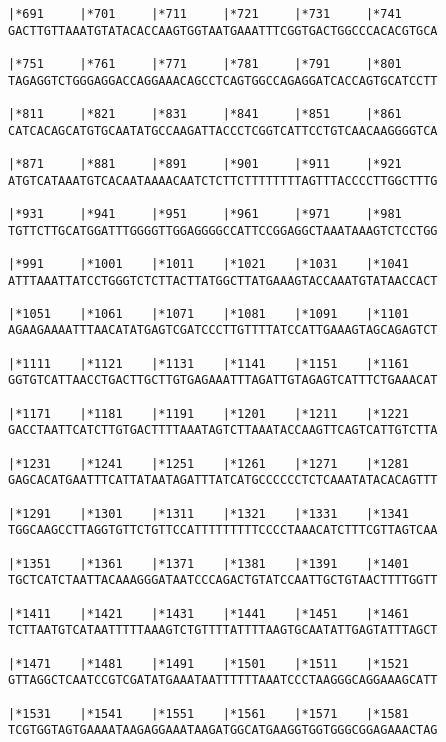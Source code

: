 \documentclass{article}
\begin{document}
\begin{Verbatim}[fontfamily=courier]
|*691     |*701     |*711     |*721     |*731     |*741     
GACTTGTTAAATGTATACACCAAGTGGTAATGAAATTTCGGTGACTGGCCCACACGTGCA

|*751     |*761     |*771     |*781     |*791     |*801     
TAGAGGTCTGGGAGGACCAGGAAACAGCCTCAGTGGCCAGAGGATCACCAGTGCATCCTT

|*811     |*821     |*831     |*841     |*851     |*861     
CATCACAGCATGTGCAATATGCCAAGATTACCCTCGGTCATTCCTGTCAACAAGGGGTCA

|*871     |*881     |*891     |*901     |*911     |*921     
ATGTCATAAATGTCACAATAAAACAATCTCTTCTTTTTTTTAGTTTACCCCTTGGCTTTG

|*931     |*941     |*951     |*961     |*971     |*981     
TGTTCTTGCATGGATTTGGGGTTGGAGGGGCCATTCCGGAGGCTAAATAAAGTCTCCTGG

|*991     |*1001    |*1011    |*1021    |*1031    |*1041    
ATTTAAATTATCCTGGGTCTCTTACTTATGGCTTATGAAAGTACCAAATGTATAACCACT

|*1051    |*1061    |*1071    |*1081    |*1091    |*1101    
AGAAGAAAATTTAACATATGAGTCGATCCCTTGTTTTATCCATTGAAAGTAGCAGAGTCT

|*1111    |*1121    |*1131    |*1141    |*1151    |*1161    
GGTGTCATTAACCTGACTTGCTTGTGAGAAATTTAGATTGTAGAGTCATTTCTGAAACAT

|*1171    |*1181    |*1191    |*1201    |*1211    |*1221    
GACCTAATTCATCTTGTGACTTTTAAATAGTCTTAAATACCAAGTTCAGTCATTGTCTTA

|*1231    |*1241    |*1251    |*1261    |*1271    |*1281    
GAGCACATGAATTTCATTATAATAGATTTATCATGCCCCCCTCTCAAATATACACAGTTT

|*1291    |*1301    |*1311    |*1321    |*1331    |*1341    
TGGCAAGCCTTAGGTGTTCTGTTCCATTTTTTTTTCCCCTAAACATCTTTCGTTAGTCAA

|*1351    |*1361    |*1371    |*1381    |*1391    |*1401    
TGCTCATCTAATTACAAAGGGATAATCCCAGACTGTATCCAATTGCTGTAACTTTTGGTT

|*1411    |*1421    |*1431    |*1441    |*1451    |*1461    
TCTTAATGTCATAATTTTTAAAGTCTGTTTTATTTTAAGTGCAATATTGAGTATTTAGCT

|*1471    |*1481    |*1491    |*1501    |*1511    |*1521    
GTTAGGCTCAATCCGTCGATATGAAATAATTTTTTAAATCCCTAAGGGCAGGAAAGCATT

|*1531    |*1541    |*1551    |*1561    |*1571    |*1581    
TCGTGGTAGTGAAAATAAGAGGAAATAAGATGGCATGAAGGTGGTGGGCGGAGAAACTAG

\end{Verbatim}
\newpage
\end{document}
